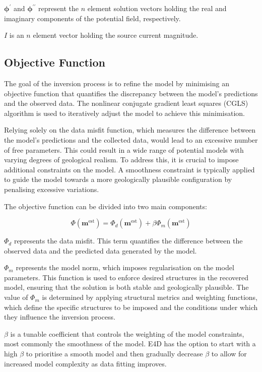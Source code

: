 \documentclass[a4paper,12pt]{article}
\begin{document}
$\boldsymbol {\phi}^{\prime}$ and $\boldsymbol {\phi}^{\prime\prime}$ represent the $n$ element solution vectors holding the real and imaginary components of the potential field, respectively.

$I$ is an $n$ element vector holding the source current magnitude.

\subsection{Objective Function}

The goal of the inversion process is to refine the model by minimising an objective function that quantifies the discrepancy between the model's predictions and the observed data. The nonlinear conjugate gradient least squares (CGLS) algorithm is used to iteratively adjust the model to achieve this minimisation. 

Relying solely on the data misfit function, which measures the difference between the model's predictions and the collected data, would lead to an excessive number of free parameters. This could result in a wide range of potential models with varying degrees of geological realism. To address this, it is crucial to impose additional constraints on the model. A smoothness constraint is typically applied to guide the model towards a more geologically plausible configuration by penalising excessive variations.

The objective function can be divided into two main components:

\begin{equation}
\Phi (\mathbf{m}^{\text{est}}) = \Phi_d (\mathbf{m}^{\text{est}}) + \beta \Phi_m (\mathbf{m}^{\text{est}})
\end{equation}

$\Phi_d$ represents the data misfit. This term quantifies the difference between the observed data and the predicted data generated by the model.

\(\Phi_m\) represents the model norm, which imposes regularisation on the model parameters. This function is used to enforce desired structures in the recovered model, ensuring that the solution is both stable and geologically plausible. The value of \(\Phi_m\) is determined by applying structural metrics and weighting functions, which define the specific structures to be imposed and the conditions under which they influence the inversion process.

$\beta$ is a tunable coefficient that controls the weighting of the model constraints, most commonly the smoothness of the model. E4D has the option to start with a high $\beta$ to prioritise a smooth model and then gradually decrease $\beta$ to allow for increased model complexity as data fitting improves.
\end{document}
